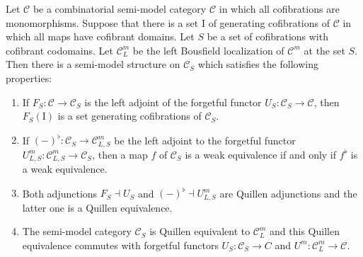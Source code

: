 \documentclass[reqno]{amsart}
\theoremstyle{definition}
\theoremstyle{remark}
\newcommand{\fs}[1]{\mathrm{#1}}
\newcommand{\cat}[1]{\mathcal{#1}}
\newcommand{\C}{\cat{C}}
\newcommand{\I}{\fs{I}}
\numberwithin{figure}{section}
\begin{document}
\begin{thm}
Let $\C$ be a combinatorial semi-model category $\C$ in which all cofibrations are monomorphisms.
Suppose that there is a set $\I$ of generating cofibrations of $\C$ in which all maps have cofibrant domains.
Let $S$ be a set of cofibrations with cofibrant codomains.
Let $\C^m_L$ be the left Bousfield localization of $\C^m$ at the set $S$.
Then there is a semi-model structure on $\C_S$ which satisfies the following properties:
\begin{enumerate}
\item \label{it:alg-cof} If $F_S : \C \to \C_S$ is the left adjoint of the forgetful functor $U_S : \C_S \to \C$, then $F_S(\I)$ is a set generating cofibrations of $\C_S$.
\item \label{it:alg-we} If $(-)^\flat : \C_S \to \C^m_{L,S}$ be the left adjoint to the forgetful functor $U^m_{L,S} : \C^m_{L,S} \to \C_S$, then a map $f$ of $\C_S$ is a weak equivalence if and only if $f^\flat$ is a weak equivalence.
\item Both adjunctions $F_S \dashv U_S$ and $(-)^\flat \dashv U^m_{L,S}$ are Quillen adjunctions and the latter one is a Quillen equivalence.
\item The semi-model category $\C_S$ is Quillen equivalent to $\C^m_L$ and this Quillen equivalence commutes with forgetful functors $U_S : \C_S \to C$ and $U^m : \C^m_L \to \C$.
\end{enumerate}
\end{thm}
\end{document}
